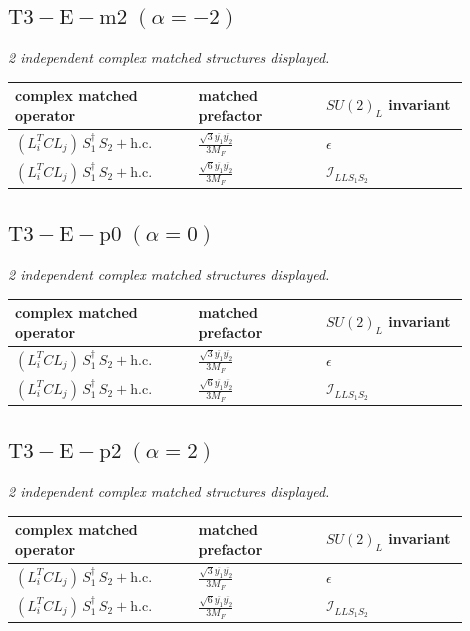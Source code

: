 \documentclass[9pt]{article}
\begin{document}
\subsection*{$ \mathrm{T3-E-m2}\;(\alpha=-2) $}
\textit{2 independent complex matched structures displayed. }
\begin{longtable}{@{}p{0.36\linewidth}p{0.25\linewidth}p{0.29\linewidth}@{}}
\toprule
complex matched operator & matched prefactor & $SU(2)_L$ invariant \\
\midrule
$ (L_i^T C L_j)\,S_1^\dagger\,S_2+\mathrm{h.c.} $ & $ \frac{\sqrt{3} \overline{y_{1}} \overline{y_{2}}}{3 M_F} $ & $ \epsilon $ \\
$ (L_i^T C L_j)\,S_1^\dagger\,S_2+\mathrm{h.c.} $ & $ \frac{\sqrt{6} \overline{y_{1}} \overline{y_{2}}}{3 M_F} $ & $ \mathcal{I}_{LLS_1S_2} $ \\
\bottomrule
\end{longtable}
\subsection*{$ \mathrm{T3-E-p0}\;(\alpha=0) $}
\textit{2 independent complex matched structures displayed. }
\begin{longtable}{@{}p{0.36\linewidth}p{0.25\linewidth}p{0.29\linewidth}@{}}
\toprule
complex matched operator & matched prefactor & $SU(2)_L$ invariant \\
\midrule
$ (L_i^T C L_j)\,S_1^\dagger\,S_2+\mathrm{h.c.} $ & $ \frac{\sqrt{3} \overline{y_{1}} \overline{y_{2}}}{3 M_F} $ & $ \epsilon $ \\
$ (L_i^T C L_j)\,S_1^\dagger\,S_2+\mathrm{h.c.} $ & $ \frac{\sqrt{6} \overline{y_{1}} \overline{y_{2}}}{3 M_F} $ & $ \mathcal{I}_{LLS_1S_2} $ \\
\bottomrule
\end{longtable}
\subsection*{$ \mathrm{T3-E-p2}\;(\alpha=2) $}
\textit{2 independent complex matched structures displayed. }
\begin{longtable}{@{}p{0.36\linewidth}p{0.25\linewidth}p{0.29\linewidth}@{}}
\toprule
complex matched operator & matched prefactor & $SU(2)_L$ invariant \\
\midrule
$ (L_i^T C L_j)\,S_1^\dagger\,S_2+\mathrm{h.c.} $ & $ \frac{\sqrt{3} \overline{y_{1}} \overline{y_{2}}}{3 M_F} $ & $ \epsilon $ \\
$ (L_i^T C L_j)\,S_1^\dagger\,S_2+\mathrm{h.c.} $ & $ \frac{\sqrt{6} \overline{y_{1}} \overline{y_{2}}}{3 M_F} $ & $ \mathcal{I}_{LLS_1S_2} $ \\
\bottomrule
\end{longtable}
\end{document}
